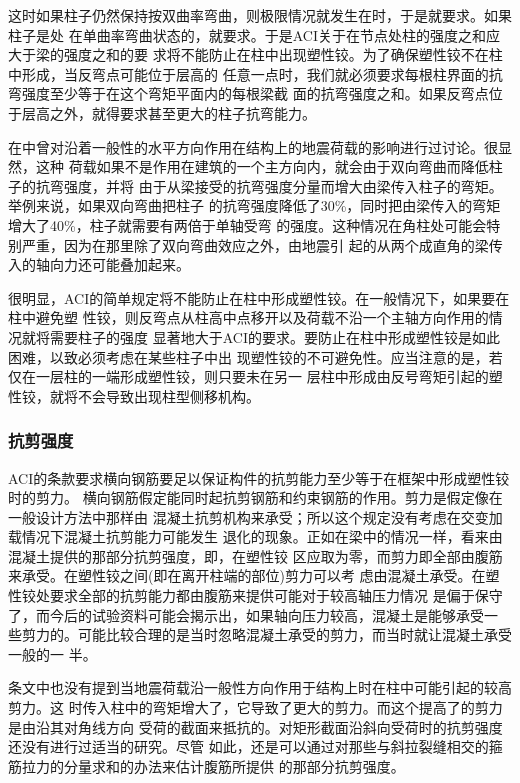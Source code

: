 \documentclass[12pt,a4paper]{book}
\begin{document}
这时如果柱子仍然保持按双曲率弯曲，则极限情况就发生在时，于是就要求。如果柱子是处
在单曲率弯曲状态的，就要求。于是ACI关于在节点处柱的强度之和应大于梁的强度之和的要
求将不能防止在柱中出现塑性铰。为了确保塑性铰不在柱中形成，当反弯点可能位于层高的
任意一点时，我们就必须要求每根柱界面的抗弯强度至少等于在这个弯矩平面内的每根梁截
面的抗弯强度之和。如果反弯点位于层高之外，就得要求甚至更大的柱子抗弯能力。



在中曾对沿着一般性的水平方向作用在结构上的地震荷载的影响进行过讨论。很显然，这种
荷载如果不是作用在建筑的一个主方向内，就会由于双向弯曲而降低柱子的抗弯强度，并将
由于从梁接受的抗弯强度分量而增大由梁传入柱子的弯矩。举例来说，如果双向弯曲把柱子
的抗弯强度降低了30\%，同时把由梁传入的弯矩增大了40\%，柱子就需要有两倍于单轴受弯
的强度。这种情况在角柱处可能会特别严重，因为在那里除了双向弯曲效应之外，由地震引
起的从两个成直角的梁传入的轴向力还可能叠加起来。

很明显，ACI的简单规定将不能防止在柱中形成塑性铰。在一般情况下，如果要在柱中避免塑
性铰，则反弯点从柱高中点移开以及荷载不沿一个主轴方向作用的情况就将需要柱子的强度
显著地大于ACI的要求。要防止在柱中形成塑性铰是如此困难，以致必须考虑在某些柱子中出
现塑性铰的不可避免性。应当注意的是，若仅在一层柱的一端形成塑性铰，则只要未在另一
层柱中形成由反号弯矩引起的塑性铰，就将不会导致出现柱型侧移机构。

\subsubsection{抗剪强度}

ACI的条款要求横向钢筋要足以保证构件的抗剪能力至少等于在框架中形成塑性铰时的剪力。
横向钢筋假定能同时起抗剪钢筋和约束钢筋的作用。剪力是假定像在一般设计方法中那样由
混凝土抗剪机构来承受；所以这个规定没有考虑在交变加载情况下混凝土抗剪能力可能发生
退化的现象。正如在梁中的情况一样，看来由混凝土提供的那部分抗剪强度，即，在塑性铰
区应取为零，而剪力即全部由腹筋来承受。在塑性铰之间(即在离开柱端的部位)剪力可以考
虑由混凝土承受。在塑性铰处要求全部的抗剪能力都由腹筋来提供可能对于较高轴压力情况
是偏于保守了，而今后的试验资料可能会揭示出，如果轴向压力较高，混凝土是能够承受一
些剪力的。可能比较合理的是当时忽略混凝土承受的剪力，而当时就让混凝土承受一般的一
半。

条文中也没有提到当地震荷载沿一般性方向作用于结构上时在柱中可能引起的较高剪力。这
时传入柱中的弯矩增大了，它导致了更大的剪力。而这个提高了的剪力是由沿其对角线方向
受荷的截面来抵抗的。对矩形截面沿斜向受荷时的抗剪强度还没有进行过适当的研究。尽管
如此，还是可以通过对那些与斜拉裂缝相交的箍筋拉力的分量求和的办法来估计腹筋所提供
的那部分抗剪强度。
\end{document}
